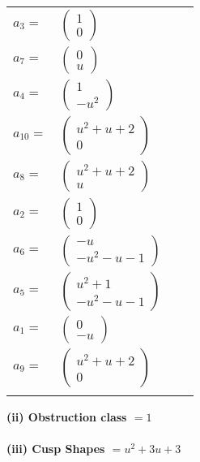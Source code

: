 \documentclass[1p]{elsarticle_modified}
\theoremstyle{definition}
\begin{document}
\begin{tabular}{m{7pt} m{180pt} m{7pt} m{180pt} }
\flushright $a_{3}=$&$\begin{pmatrix}1\\0\end{pmatrix}$ \\
\flushright $a_{7}=$&$\begin{pmatrix}0\\u\end{pmatrix}$ \\
\flushright $a_{4}=$&$\begin{pmatrix}1\\- u^2\end{pmatrix}$ \\
\flushright $a_{10}=$&$\begin{pmatrix}u^2+u+2\\0\end{pmatrix}$ \\
\flushright $a_{8}=$&$\begin{pmatrix}u^2+u+2\\u\end{pmatrix}$ \\
\flushright $a_{2}=$&$\begin{pmatrix}1\\0\end{pmatrix}$ \\
\flushright $a_{6}=$&$\begin{pmatrix}- u\\- u^2- u-1\end{pmatrix}$ \\
\flushright $a_{5}=$&$\begin{pmatrix}u^2+1\\- u^2- u-1\end{pmatrix}$ \\
\flushright $a_{1}=$&$\begin{pmatrix}0\\- u\end{pmatrix}$ \\
\flushright $a_{9}=$&$\begin{pmatrix}u^2+u+2\\0\end{pmatrix}$\\&\end{tabular}
\flushleft \textbf{(ii) Obstruction class $= 1$}\\~\\
\flushleft \textbf{(iii) Cusp Shapes $= u^2+3 u+3$}\\~\\
\end{document}
